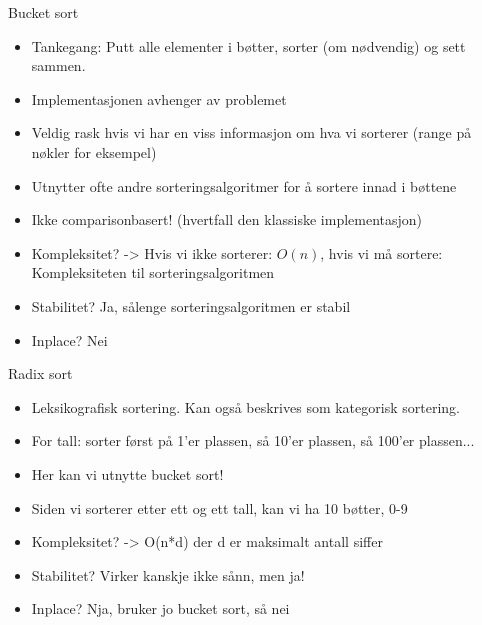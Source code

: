 \documentclass[norsk, handout]{beamer}
\begin{document}
    \begin{frame}{Bucket sort}
        \begin{itemize}
            \item Tankegang: Putt alle elementer i bøtter, sorter (om nødvendig) og sett sammen.
            \item Implementasjonen avhenger av problemet
            \item Veldig rask hvis vi har en viss informasjon om hva vi sorterer (range på nøkler
                for eksempel)
            \item Utnytter ofte andre sorteringsalgoritmer for å sortere innad i bøttene
            \item Ikke comparisonbasert! (hvertfall den klassiske implementasjon)
            \item Kompleksitet? \pause -> Hvis vi ikke sorterer: $O(n)$, hvis vi må sortere:
                Kompleksiteten til sorteringsalgoritmen
            \item Stabilitet? \pause Ja, sålenge sorteringsalgoritmen er stabil
            \item Inplace? \pause Nei
        \end{itemize}
    \end{frame}

    \begin{frame}{Radix sort}
        \begin{itemize}
            \item Leksikografisk sortering. Kan også beskrives som kategorisk sortering.
            \item For tall: sorter først på 1'er plassen, så 10'er plassen, så 100'er plassen...
            \item Her kan vi utnytte bucket sort!
            \item Siden vi sorterer etter ett og ett tall, kan vi ha 10 bøtter, 0-9
            \item Kompleksitet? \pause -> O(n*d) der d er maksimalt antall siffer
            \item Stabilitet? \pause Virker kanskje ikke sånn, men ja!
            \item Inplace? \pause Nja, bruker jo bucket sort, så nei
        \end{itemize}
    \end{frame}
\end{document}
